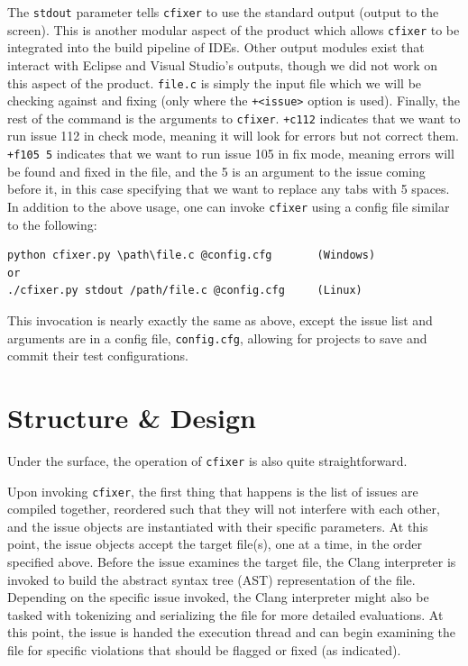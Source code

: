 \documentclass[11pt]{scrreprt}
\begin{document}
The \texttt{stdout} parameter tells \texttt{cfixer} to use the standard output (output to the screen).
This is another modular aspect of the product which allows \texttt{cfixer} to be integrated into the build pipeline of IDEs.
Other output modules exist that interact with Eclipse and Visual Studio’s outputs, though we did not work on this aspect of the product.
\texttt{file.c} is simply the input file which we will be checking against and fixing (only where the \texttt{+<issue>} option is used). 
Finally, the rest of the command is the arguments to \texttt{cfixer}.
\texttt{+c112} indicates that we want to run issue 112 in check mode, meaning it will look for errors but not correct them.
\texttt{+f105 5} indicates that we want to run issue 105 in fix mode, meaning errors will be found and fixed in the file, and the 5 is an argument to the issue coming before it, in this case specifying that we want to replace any tabs with 5 spaces.
In addition to the above usage, one can invoke \texttt{cfixer} using a config file similar to the following:\\
\lstset{language=Python}
\begin{minipage}{\linewidth}
\begin{lstlisting}[frame=single,basicstyle=\small]
python cfixer.py \path\file.c @config.cfg		(Windows)
or
./cfixer.py stdout /path/file.c @config.cfg		(Linux)
\end{lstlisting}
\end{minipage}

This invocation is nearly exactly the same as above, except the issue list and arguments are in a config file, \texttt{config.cfg}, allowing for projects to save and commit their test configurations.

\section{Structure \& Design}

Under the surface, the operation of \texttt{cfixer} is also quite straightforward.

Upon invoking \texttt{cfixer}, the first thing that happens is the list of issues are compiled together, reordered such that they will not interfere with each other, and the issue objects are instantiated with their specific parameters.
At this point, the issue objects accept the target file(s), one at a time, in the order specified above.
Before the issue examines the target file, the Clang interpreter is invoked to build the abstract syntax tree (AST) representation of the file.
Depending on the specific issue invoked, the Clang interpreter might also be tasked with tokenizing and serializing the file for more detailed evaluations.
At this point, the issue is handed the execution thread and can begin examining the file for specific violations that should be flagged or fixed (as indicated).
\end{document}
